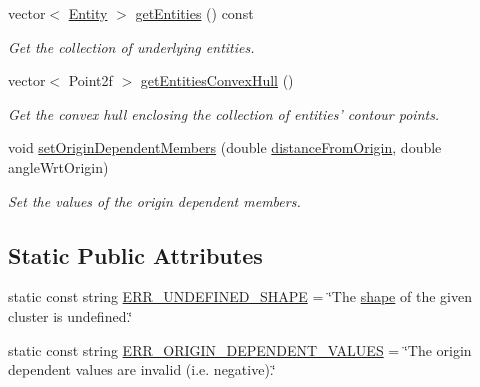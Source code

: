 \begin{DoxyCompactItemize}
vector$<$ \hyperlink{classmultiscale_1_1analysis_1_1Entity}{Entity} $>$ \hyperlink{classmultiscale_1_1analysis_1_1Cluster_aedd64d46ad3ea61ce7bb76be1f0906e6}{get\-Entities} () const 
\begin{DoxyCompactList}\small\item\em Get the collection of underlying entities. \end{DoxyCompactList}\item 
vector$<$ Point2f $>$ \hyperlink{classmultiscale_1_1analysis_1_1Cluster_a9f43161c58d9e4a97f3a33807397b255}{get\-Entities\-Convex\-Hull} ()
\begin{DoxyCompactList}\small\item\em Get the convex hull enclosing the collection of entities' contour points. \end{DoxyCompactList}\item 
void \hyperlink{classmultiscale_1_1analysis_1_1Cluster_a84033ee8d583d9195abbf42d5d420915}{set\-Origin\-Dependent\-Members} (double \hyperlink{classmultiscale_1_1analysis_1_1SpatialEntityPseudo3D_a056f67b90ed41c0e6dc4df31b71ad906}{distance\-From\-Origin}, double angle\-Wrt\-Origin)
\begin{DoxyCompactList}\small\item\em Set the values of the origin dependent members. \end{DoxyCompactList}\end{DoxyCompactItemize}
\subsection*{Static Public Attributes}
\begin{DoxyCompactItemize}
\item 
static const string \hyperlink{classmultiscale_1_1analysis_1_1Cluster_a546b8e93e3f1ef51a9932f8599639070}{E\-R\-R\-\_\-\-U\-N\-D\-E\-F\-I\-N\-E\-D\-\_\-\-S\-H\-A\-P\-E} = \char`\"{}The \hyperlink{classmultiscale_1_1analysis_1_1SpatialEntityPseudo3D_abad3acd3d7067e8e86e168e692cb2c2e}{shape} of the given cluster is undefined.\char`\"{}
\item 
static const string \hyperlink{classmultiscale_1_1analysis_1_1Cluster_a0fa38fcc3f00730409400578829cddd8}{E\-R\-R\-\_\-\-O\-R\-I\-G\-I\-N\-\_\-\-D\-E\-P\-E\-N\-D\-E\-N\-T\-\_\-\-V\-A\-L\-U\-E\-S} = \char`\"{}The origin dependent values are invalid (i.\-e. negative).\char`\"{}
\end{DoxyCompactItemize}
